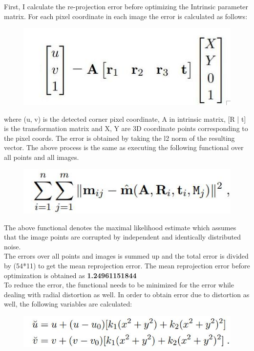 \documentclass[conference]{IEEEtran}
\begin{document}
First, I calculate the re-projection error before optimizing the Intrinsic parameter matrix. For each pixel coordinate in each image the error is calculated as follows:
\begin{figure}[H]
\centering
\includegraphics[scale = 0.35]{10.jpg}
\label{fig_sim}
\end{figure}

where (u, v) is the detected corner pixel coordinate, A in intrinsic matrix, [R | t] is the transformation matrix and X, Y are 3D coordinate points corresponding to the pixel coords. The error is obtained by taking the l2 norm of the resulting vector. The above process is the same as executing the following functional over all points and all images.
\begin{figure}[H]
\centering
\includegraphics[scale = 0.35]{11.jpg}
\label{fig_sim}
\end{figure}

The above functional denotes the maximal likelihood estimate which assumes that the image points are corrupted by independent and identically distributed noise.  \\

The errors over all points and images is summed up and the total error is divided by (54*11) to get the mean reprojection error. The mean reprojection error before optimization is obtained as \textbf{1.24961151844} \\

To reduce the error, the functional needs to be minimized for the error while dealing with radial distortion as well. In order to obtain error due to distortion as well, the following variables are calculated:
\begin{figure}[H]
\centering
\includegraphics[scale = 0.35]{12.jpg}
\label{fig_sim}
\end{figure}
\end{document}
